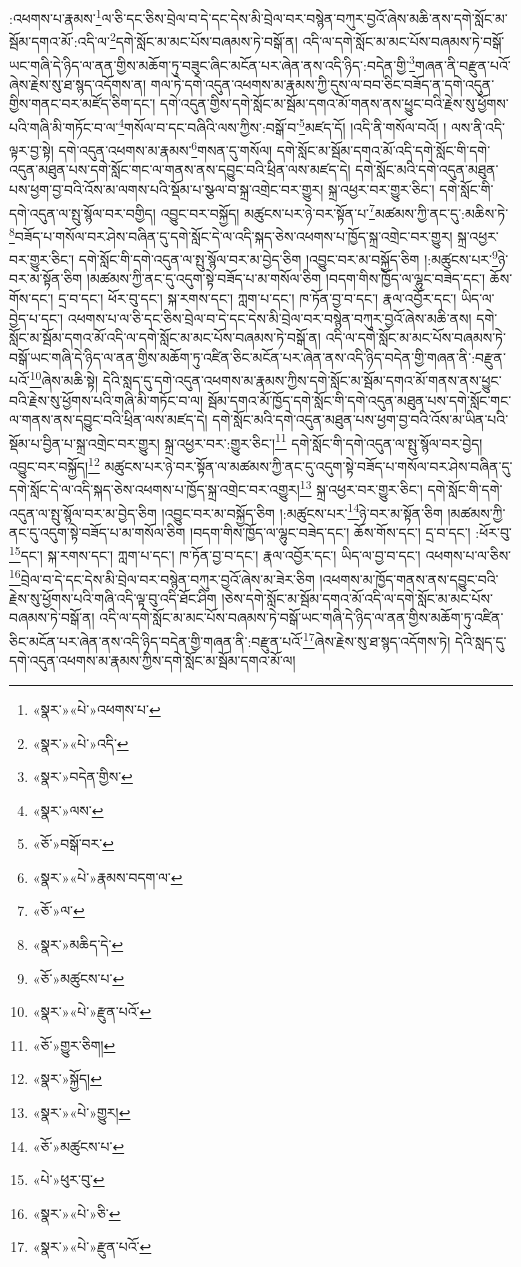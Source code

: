 :འཕགས་པ་རྣམས་\footnote{«སྣར་»«པེ་»འཕགས་པ་}ལ་ཅི་དང་ཅིས་བྲེལ་བ་དེ་དང་དེས་མི་བྲེལ་བར་བསྙེན་བཀུར་བྱའོ་ཞེས་མཆི་ནས་དགེ་སློང་མ་སྦོམ་དགའ་མོ་:འདི་ལ་\footnote{«སྣར་»«པེ་»འདི་}དགེ་སློང་མ་མང་པོས་བཞམས་ཏེ་བསྒོ་ན། འདི་ལ་དགེ་སློང་མ་མང་པོས་བཞམས་ཏེ་བསྒོ་ཡང་གཞི་དེ་ཉིད་ལ་ནན་གྱིས་མཆོག་ཏུ་བཟུང་ཞིང་མངོན་པར་ཞེན་ནས་འདི་ཉིད་:བདེན་གྱི་\footnote{«སྣར་»བདེན་གྱིས་}གཞན་ནི་བརྫུན་པའོ་ཞེས་རྗེས་སུ་ཐ་སྙད་འདོགས་ན། གལ་ཏེ་དགེ་འདུན་འཕགས་མ་རྣམས་ཀྱི་དུས་ལ་བབ་ཅིང་བཟོད་ན་དགེ་འདུན་གྱིས་གནང་བར་མཛོད་ཅིག་དང་། དགེ་འདུན་གྱིས་དགེ་སློང་མ་སྦོམ་དགའ་མོ་གནས་ནས་ཕྱུང་བའི་རྗེས་སུ་ཕྱོགས་པའི་གཞི་མི་གཏོང་བ་ལ་\footnote{«སྣར་»ལས་}གསོལ་བ་དང་བཞིའི་ལས་ཀྱིས་:བསྒོ་བ་\footnote{«ཅོ་»བསྒོ་བར་}མཛད་དོ། །འདི་ནི་གསོལ་བའོ། །
ལས་ནི་འདི་ལྟར་བྱ་སྟེ། དགེ་འདུན་འཕགས་མ་རྣམས་\footnote{«སྣར་»«པེ་»རྣམས་བདག་ལ་}གསན་དུ་གསོལ། དགེ་སློང་མ་སྦོམ་དགའ་མོ་འདི་དགེ་སློང་གི་དགེ་འདུན་མཐུན་པས་དགེ་སློང་གང་ལ་གནས་ནས་དབྱུང་བའི་ཕྲིན་ལས་མཛད་དེ། དགེ་སློང་མའི་དགེ་འདུན་མཐུན་པས་ཕྱག་བྱ་བའི་འོས་མ་ལགས་པའི་སྡོམ་པ་སྩལ་བ་སྐྲ་འགྲེང་བར་གྱུར། སྐྲ་འཕྱར་བར་གྱུར་ཅིང་། དགེ་སློང་གི་དགེ་འདུན་ལ་སྤུ་སྙོལ་བར་བགྱིད། འབྱུང་བར་བསྐྱོད། མཚུངས་པར་ཉེ་བར་སྟོན་པ་\footnote{«ཅོ་»ལ་}མཚམས་ཀྱི་ནང་དུ་:མཆིས་ཏེ་\footnote{«སྣར་»མཆིད་དེ་}བཟོད་པ་གསོལ་བར་ཤེས་བཞིན་དུ་དགེ་སློང་དེ་ལ་འདི་སྐད་ཅེས་འཕགས་པ་ཁྱོད་སྐྲ་འགྲེང་བར་གྱུར། སྐྲ་འཕྱར་བར་གྱུར་ཅིང་། དགེ་སློང་གི་དགེ་འདུན་ལ་སྤུ་སྙོལ་བར་མ་བྱེད་ཅིག །འབྱུང་བར་མ་བསྐྱོད་ཅིག །:མཚུངས་པར་\footnote{«ཅོ་»མཚུངས་པ་}ཉེ་བར་མ་སྟོན་ཅིག །མཚམས་ཀྱི་ནང་དུ་འདུག་སྟེ་བཟོད་པ་མ་གསོལ་ཅིག །བདག་གིས་ཁྱོད་ལ་ལྷུང་བཟེད་དང་། ཆོས་གོས་དང་། དྲ་བ་དང་། ཕོར་བུ་དང་། སྐ་རགས་དང་། ཀླག་པ་དང་། ཁ་ཏོན་བྱ་བ་དང་། རྣལ་འབྱོར་དང་། ཡིད་ལ་བྱེད་པ་དང་། འཕགས་པ་ལ་ཅི་དང་ཅིས་བྲེལ་བ་དེ་དང་དེས་མི་བྲེལ་བར་བསྙེན་བཀུར་བྱའོ་ཞེས་མཆི་ནས། དགེ་སློང་མ་སྦོམ་དགའ་མོ་འདི་ལ་དགེ་སློང་མ་མང་པོས་བཞམས་ཏེ་བསྒོ་ན། འདི་ལ་དགེ་སློང་མ་མང་པོས་བཞམས་ཏེ་བསྒོ་ཡང་གཞི་དེ་ཉིད་ལ་ནན་གྱིས་མཆོག་ཏུ་འཛིན་ཅིང་མངོན་པར་ཞེན་ནས་འདི་ཉིད་བདེན་གྱི་གཞན་ནི་:བརྫུན་པའོ་\footnote{«སྣར་»«པེ་»རྫུན་པའོ་}ཞེས་མཆི་སྟེ། དེའི་སླད་དུ་དགེ་འདུན་འཕགས་མ་རྣམས་ཀྱིས་དགེ་སློང་མ་སྦོམ་དགའ་མོ་གནས་ནས་ཕྱུང་བའི་རྗེས་སུ་ཕྱོགས་པའི་གཞི་མི་གཏོང་བ་ལ། སྦོམ་དགའ་མོ་ཁྱོད་དགེ་སློང་གི་དགེ་འདུན་མཐུན་པས་དགེ་སློང་གང་ལ་གནས་ནས་དབྱུང་བའི་ཕྲིན་ལས་མཛད་དེ། དགེ་སློང་མའི་དགེ་འདུན་མཐུན་པས་ཕྱག་བྱ་བའི་འོས་མ་ཡིན་པའི་སྡོམ་པ་བྱིན་པ་སྐྲ་འགྲེང་བར་གྱུར། སྐྲ་འཕྱར་བར་:གྱུར་ཅིང་།\footnote{«ཅོ་»གྱུར་ཅིག།} དགེ་སློང་གི་དགེ་འདུན་ལ་སྤུ་སྙོལ་བར་བྱེད། འབྱུང་བར་བསྐྱོད།\footnote{«སྣར་»སྐྱོད།} མཚུངས་པར་ཉེ་བར་སྟོན་ལ་མཚམས་ཀྱི་ནང་དུ་འདུག་སྟེ་བཟོད་པ་གསོལ་བར་ཤེས་བཞིན་དུ་དགེ་སློང་དེ་ལ་འདི་སྐད་ཅེས་འཕགས་པ་ཁྱོད་སྐྲ་འགྲེང་བར་འགྱུར།\footnote{«སྣར་»«པེ་»གྱུར།} སྐྲ་འཕྱར་བར་གྱུར་ཅིང་། དགེ་སློང་གི་དགེ་འདུན་ལ་སྤུ་སྙོལ་བར་མ་བྱེད་ཅིག །འབྱུང་བར་མ་བསྐྱོད་ཅིག །:མཚུངས་པར་\footnote{«ཅོ་»མཚུངས་པ་}ཉེ་བར་མ་སྟོན་ཅིག །མཚམས་ཀྱི་ནང་དུ་འདུག་སྟེ་བཟོད་པ་མ་གསོལ་ཅིག །བདག་གིས་ཁྱོད་ལ་ལྷུང་བཟེད་དང་། ཆོས་གོས་དང་། དྲ་བ་དང་། :ཕོར་བུ་\footnote{«པེ་»ཕུར་བུ་}དང་། སྐ་རགས་དང་། ཀླག་པ་དང་། ཁ་ཏོན་བྱ་བ་དང་། རྣལ་འབྱོར་དང་། ཡིད་ལ་བྱ་བ་དང་། འཕགས་པ་ལ་ཅིས་\footnote{«སྣར་»«པེ་»ཅི་}བྲེལ་བ་དེ་དང་དེས་མི་བྲེལ་བར་བསྙེན་བཀུར་བྱའོ་ཞེས་མ་ཟེར་ཅིག །འཕགས་མ་ཁྱོད་གནས་ནས་དབྱུང་བའི་རྗེས་སུ་ཕྱོགས་པའི་གཞི་འདི་ལྟ་བུ་འདི་ཐོང་ཤིག །ཅེས་དགེ་སློང་མ་སྦོམ་དགའ་མོ་འདི་ལ་དགེ་སློང་མ་མང་པོས་བཞམས་ཏེ་བསྒོ་ན། འདི་ལ་དགེ་སློང་མ་མང་པོས་བཞམས་ཏེ་བསྒོ་ཡང་གཞི་དེ་ཉིད་ལ་ནན་གྱིས་མཆོག་ཏུ་འཛིན་ཅིང་མངོན་པར་ཞེན་ནས་འདི་ཉིད་བདེན་གྱི་གཞན་ནི་:བརྫུན་པའོ་\footnote{«སྣར་»«པེ་»རྫུན་པའོ་}ཞེས་རྗེས་སུ་ཐ་སྙད་འདོགས་ཏེ། དེའི་སླད་དུ་དགེ་འདུན་འཕགས་མ་རྣམས་ཀྱིས་དགེ་སློང་མ་སྦོམ་དགའ་མོ་ལ། 